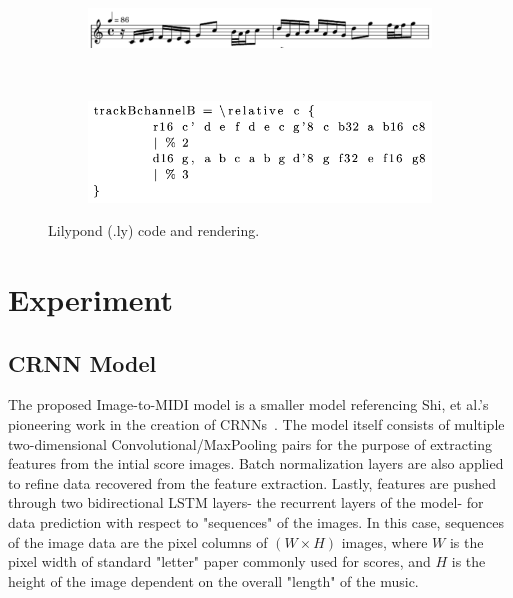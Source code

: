 \documentclass[nonacm, sigconf]{acmart}
\begin{document}
\begin{figure}
	\begin{subfigure}
		\centering
		\includegraphics[width = .8\linewidth]{./figures/lilypond-snippet.png}
	\end{subfigure}
	~
	\begin{subfigure}
		\centering
		\includegraphics[width = .8\linewidth]{./figures/lilypond-code.png}
	\end{subfigure}
	\caption{Lilypond (.ly) code and rendering.}
	\label{fig:lilypond-example}
\end{figure}

\section{Experiment}

\subsection{CRNN Model}
The proposed Image-to-MIDI model is a smaller model referencing Shi, et al.'s pioneering work in the creation of CRNNs~\cite{shi2015endtoend}.
The model itself consists of multiple two-dimensional Convolutional/MaxPooling pairs for the purpose of extracting features from the intial score images.
Batch normalization layers are also applied to refine data recovered from the feature extraction.
Lastly, features are pushed through two bidirectional LSTM layers- the recurrent layers of the model- for data prediction with respect to "sequences" of the images.
In this case, sequences of the image data are the pixel columns of $(W \times H)$ images, where $W$ is the pixel width of standard "letter" paper commonly used for scores, and $H$ is the height of the image dependent on the overall "length" of the music.
\end{document}
